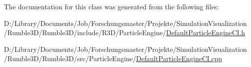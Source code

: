 The documentation for this class was generated from the following files\+:\begin{DoxyCompactItemize}
\item 
D\+:/\+Library/\+Documents/\+Job/\+Forschungsmaster/\+Projekte/\+Simulation\+Visualization/\+Rumble3\+D/\+Rumble3\+D/include/\+R3\+D/\+Particle\+Engine/\mbox{\hyperlink{_default_particle_engine_c_i_8h}{Default\+Particle\+Engine\+C\+I.\+h}}\item 
D\+:/\+Library/\+Documents/\+Job/\+Forschungsmaster/\+Projekte/\+Simulation\+Visualization/\+Rumble3\+D/\+Rumble3\+D/src/\+Particle\+Engine/\mbox{\hyperlink{_default_particle_engine_c_i_8cpp}{Default\+Particle\+Engine\+C\+I.\+cpp}}\end{DoxyCompactItemize}
